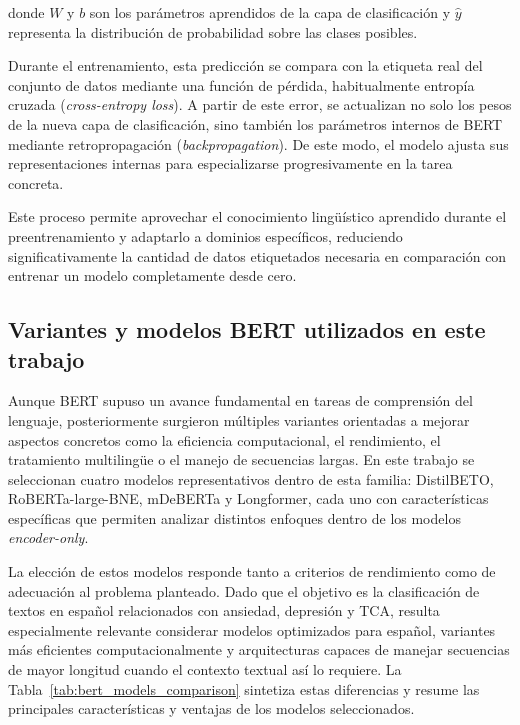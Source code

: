 donde \(W\) y \(b\) son los parámetros aprendidos de la capa de clasificación y \(\hat{y}\) representa la distribución de probabilidad sobre las clases posibles.

Durante el entrenamiento, esta predicción se compara con la etiqueta real del conjunto de datos mediante una función de pérdida, habitualmente entropía cruzada (\textit{cross-entropy loss}). A partir de este error, se actualizan no solo los pesos de la nueva capa de clasificación, sino también los parámetros internos de \ac{BERT} mediante retropropagación (\textit{backpropagation}). De este modo, el modelo ajusta sus representaciones internas para especializarse progresivamente en la tarea concreta.

Este proceso permite aprovechar el conocimiento lingüístico aprendido durante el preentrenamiento y adaptarlo a dominios específicos, reduciendo significativamente la cantidad de datos etiquetados necesaria en comparación con entrenar un modelo completamente desde cero.

\subsection{Variantes y modelos BERT utilizados en este trabajo}
\label{subsec:modelos_bert}

Aunque \ac{BERT} supuso un avance fundamental en tareas de comprensión del lenguaje, posteriormente surgieron múltiples variantes orientadas a mejorar aspectos concretos como la eficiencia computacional, el rendimiento, el tratamiento multilingüe o el manejo de secuencias largas. En este trabajo se seleccionan cuatro modelos representativos dentro de esta familia: \acs{DistilBETO}, RoBERTa-large-BNE, \acs{mDeBERTa} y Longformer, cada uno con características específicas que permiten analizar distintos enfoques dentro de los modelos \textit{encoder-only}.

La elección de estos modelos responde tanto a criterios de rendimiento como de adecuación al problema planteado. Dado que el objetivo es la clasificación de textos en español relacionados con ansiedad, depresión y \ac{TCA}, resulta especialmente relevante considerar modelos optimizados para español, variantes más eficientes computacionalmente y arquitecturas capaces de manejar secuencias de mayor longitud cuando el contexto textual así lo requiere. La Tabla~\ref{tab:bert_models_comparison} sintetiza estas diferencias y resume las principales características y ventajas de los modelos seleccionados.

